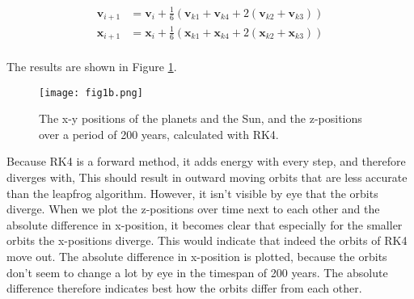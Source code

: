 \begin{align}
    \mathbf{v}_{i+1} &= \mathbf{v}_{i} + \frac{1}{6} (\mathbf{v}_{k1} + \mathbf{v}_{k4} + 2(\mathbf{v}_{k2} + \mathbf{v}_{k3})) \\
    \mathbf{x}_{i+1} &= \mathbf{x}_{i} + \frac{1}{6} (\mathbf{x}_{k1} + \mathbf{x}_{k4} + 2(\mathbf{x}_{k2} + \mathbf{x}_{k3})) \\
\end{align}

The results are shown in Figure \ref{fig:1c}.
\begin{figure}[h!]
  \centering
  \texttt{[image: fig1b.png]}
  \caption{The x-y positions of the planets and the Sun, and the z-positions over a period of 200 years, calculated with RK4.}
  \label{fig:1c}
\end{figure}

Because RK4 is a forward method, it adds energy with every step, and therefore diverges with, This should result in outward moving orbits that are less accurate than the leapfrog algorithm. However, it isn't visible by eye that the orbits diverge. When we plot the z-positions over time next to each other and the absolute difference in x-position, it becomes clear that especially for the smaller orbits the x-positions diverge. This would indicate that indeed the orbits of RK4 move out. The absolute difference in x-position is plotted, because the orbits don't seem to change a lot by eye in the timespan of 200 years. The absolute difference therefore indicates best how the orbits differ from each other. 